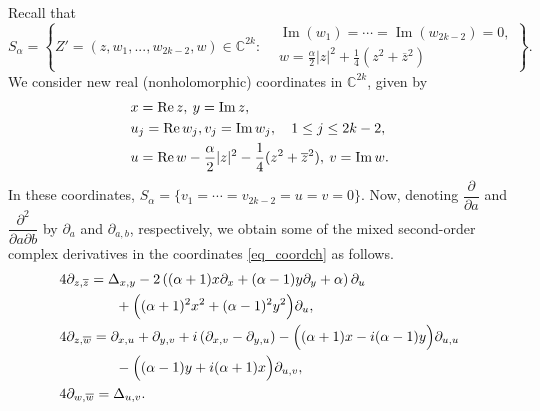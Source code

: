 \documentclass[10pt]{amsart}
\numberwithin{equation}{section}
\theoremstyle{definition}
\theoremstyle{definition}
\theoremstyle{plain}
\newcommand{\bes} {\begin{equation*}}
\newcommand{\ees} {\end{equation*}}
\newcommand{\wbar}{\overline{w}}
\newcommand{\wjb}{\overline{w_j}}
\newcommand{\wlb}{\overline{w_l}}
\newcommand{\zbar}{\overline{z}}
\newcommand\partl[2]{\dfrac{\partial{#1}}{\partial{#2}}}
\newcommand\secpartl[3]{\dfrac{\partial^2{#1}}{\partial{#2}\partial{#3}}}
\newcommand{\rea}{\operatorname{Re}}
\newcommand{\ima}{\operatorname{Im}}
\newcommand{\C} {\mathbb{C}}
\begin{document}
 Recall that
	\bes
		S_\alpha=\left\{Z'=(z,w_1,...,w_{2k-2},w)\in\C^{2k}:
			\begin{aligned}
				&\ima(w_1)=\cdots=\ima(w_{2k-2})=0,\\
					&w=\frac{\alpha}{2}|z|^2+\frac{1}{4}(z^2+\zbar^2)
			\end{aligned}
		\right\}.
	\ees
We consider new real (nonholomorphic) coordinates in $\C^{2k}$, given by
	\begin{align}
		&x=\rea z,\: y=\ima z,\notag\\
		&u_j=\rea w_j, v_j=\ima w_j, \quad 1\leq j\leq 2k-2,\label{eq_coordch}\\
		&u=\rea w-\frac{\alpha}{2}|z|^2-\frac{1}{4}(z^2+\zbar^2),\: v=\ima w.\notag
\end{align}
In these coordinates, $S_\alpha=\{v_1=\cdots =v_{2k-2}=u=v=0\}$. Now, denoting $\partl{}{a}$ and $\secpartl{}{a}{b}$ by $\partial_a$ and $\partial_{a,b}$, respectively, we obtain some of the mixed second-order complex derivatives in the coordinates \eqref{eq_coordch} as follows. 
 \begin{align}
	&4 \partial_{z,\zbar}=\Delta_{x,y}
			-2\left((\alpha+1)x\partial_{x}
				+(\alpha-1)y\partial_{y}+\alpha\right)\partial_{u}\notag\\
					&\qquad \qquad +\Big((\alpha+1)^2 x^2+(\alpha-1)^2 y^2 \Big)\partial_{u},\notag\\
	&4\partial_{z,\wbar}=
		 \partial_{x,u}+\partial_{y,v}
			+i\left(\partial_{x,v}-\partial_{y,u}\right)	
				-\Big((\alpha+1)x-i(\alpha-1)y\Big)\partial_{u,u}\notag\\
					&\qquad \qquad-\Big((\alpha-1)y+i(\alpha+1)x\Big)\partial_{u,v},
						\label{eq_IIder}\\
		&4\partial_{w,\wbar}=\Delta_{u,v}\notag.
\end{align}
\end{document}
